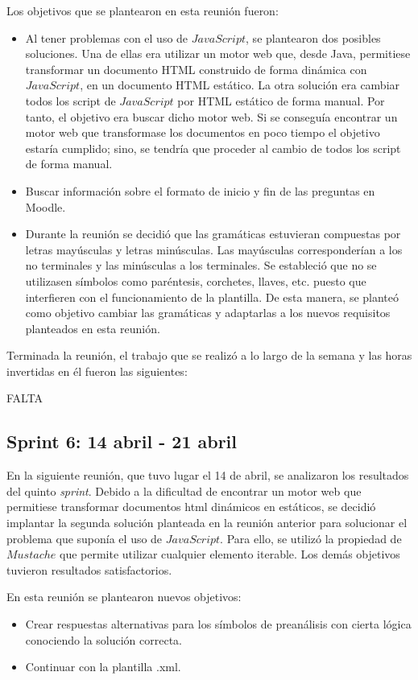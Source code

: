 Los objetivos que se plantearon en esta reunión fueron:
\begin{itemize}
\item Al tener problemas con el uso de $JavaScript$, se plantearon dos posibles soluciones. Una de ellas era utilizar un motor web que, desde Java, permitiese transformar un documento HTML construido de forma dinámica con $JavaScript$, en un documento HTML estático. La otra solución era cambiar todos los script de $JavaScript$ por HTML estático de forma manual. Por tanto, el objetivo era buscar dicho motor web. Si se conseguía encontrar un motor web que transformase los documentos en poco tiempo el objetivo estaría cumplido; sino, se tendría que proceder al cambio de todos los script de forma manual.
\item Buscar información sobre el formato de inicio y fin de las preguntas en Moodle.
\item Durante la reunión se decidió que las gramáticas estuvieran compuestas por letras mayúsculas y letras minúsculas. Las mayúsculas corresponderían a los no terminales y las minúsculas a los terminales. Se estableció que no se utilizasen símbolos como paréntesis, corchetes, llaves, etc. puesto que interfieren con el funcionamiento de la plantilla. De esta manera, se planteó como objetivo cambiar las gramáticas y adaptarlas a los nuevos requisitos planteados en esta reunión.
\end{itemize}

Terminada la reunión, el trabajo que se realizó a lo largo de la semana y las horas invertidas en él fueron las siguientes:

FALTA

\subsection{Sprint 6: 14 abril - 21 abril}
En la siguiente reunión, que tuvo lugar el 14 de abril, se analizaron los resultados del quinto \textit{sprint}. Debido a la dificultad de encontrar un motor web que permitiese transformar documentos html dinámicos en estáticos, se decidió implantar la segunda solución planteada en la reunión anterior para solucionar el problema que suponía el uso de $JavaScript$. Para ello, se utilizó la propiedad de $Mustache$ que permite utilizar cualquier elemento iterable. Los demás objetivos tuvieron resultados satisfactorios.

En esta reunión se plantearon nuevos objetivos:
\begin{itemize}
\item Crear respuestas alternativas para los símbolos de preanálisis con cierta lógica conociendo la solución correcta.
\item Continuar con la plantilla .xml.
\end{itemize}

